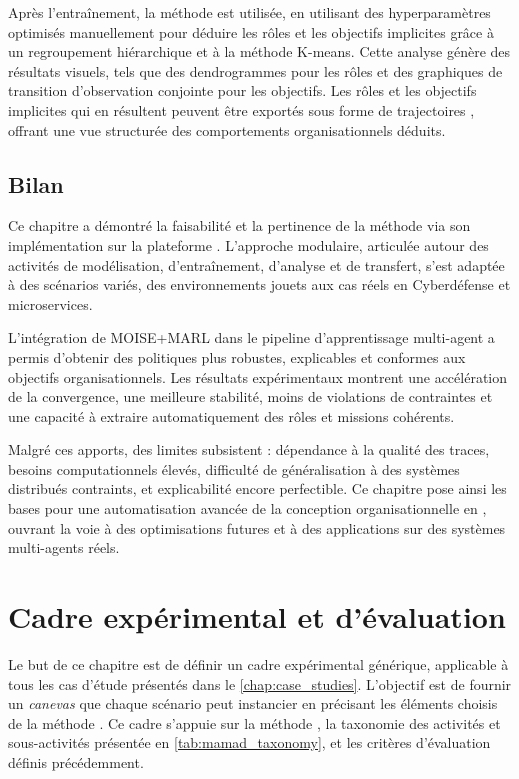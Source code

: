Après l'entraînement, la méthode  est utilisée, en utilisant des hyperparamètres optimisés manuellement pour déduire les rôles et les objectifs implicites grâce à un regroupement hiérarchique et à la méthode K-means. Cette analyse génère des résultats visuels, tels que des dendrogrammes pour les rôles et des graphiques de transition d'observation conjointe pour les objectifs. Les rôles et les objectifs implicites qui en résultent peuvent être exportés sous forme de trajectoires , offrant une vue structurée des comportements organisationnels déduits.

\section{Bilan}

Ce chapitre a démontré la faisabilité et la pertinence de la méthode  via son implémentation sur la plateforme . L'approche modulaire, articulée autour des activités de modélisation, d'entraînement, d'analyse et de transfert, s'est adaptée à des scénarios variés, des environnements jouets aux cas réels en Cyberdéfense et microservices.

L'intégration de MOISE+MARL dans le pipeline d'apprentissage multi-agent a permis d'obtenir des politiques plus robustes, explicables et conformes aux objectifs organisationnels. Les résultats expérimentaux montrent une accélération de la convergence, une meilleure stabilité, moins de violations de contraintes et une capacité à extraire automatiquement des rôles et missions cohérents.

Malgré ces apports, des limites subsistent : dépendance à la qualité des traces, besoins computationnels élevés, difficulté de généralisation à des systèmes distribués contraints, et explicabilité encore perfectible. Ce chapitre pose ainsi les bases pour une automatisation avancée de la conception organisationnelle en , ouvrant la voie à des optimisations futures et à des applications sur des systèmes multi-agents réels.

\clearpage
\thispagestyle{empty}
\null
\newpage


\chapter{Cadre expérimental et d'évaluation}
\label{chap:cadre_experimental}

Le but de ce chapitre est de définir un cadre expérimental générique, applicable à tous les cas d'étude présentés dans le \autoref{chap:case_studies}. L'objectif est de fournir un \textit{canevas} que chaque scénario peut instancier en précisant les éléments choisis de la méthode . Ce cadre s'appuie sur la méthode , la taxonomie des activités et sous-activités présentée en \autoref{tab:mamad_taxonomy}, et les critères d'évaluation définis précédemment.

